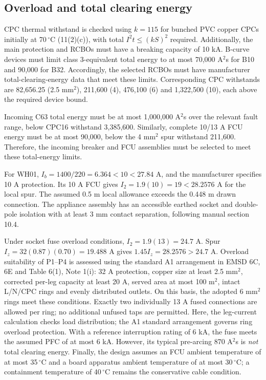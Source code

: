 \subsection*{Overload and total clearing energy}
CPC thermal withstand is checked using $k=115$ for bunched PVC copper CPCs initially at 70\,$^\circ$C (11(2)(c)), with total $I^2t\le(kS)^2$ required. Additionally, the main protection and RCBOs must have a breaking capacity of 10 kA. B-curve devices must limit class 3-equivalent total energy to at most 70,000 A$^2$s for B10 and 90,000 for B32. Accordingly, the selected RCBOs must have manufacturer total-clearing-energy data that meet these limits. Corresponding CPC withstands are 82,656.25 (2.5 mm$^2$), 211,600 (4), 476,100 (6) and 1,322,500 (10), each above the required device bound.

Incoming C63 total energy must be at most 1,000,000 A$^2$s over the relevant fault range, below CPC16 withstand 3,385,600. Similarly, complete 10/13 A FCU energy must be at most 90,000, below the 4 mm$^2$ spur withstand 211,600. Therefore, the incoming breaker and FCU assemblies must be selected to meet these total-energy limits.

For WH01, $I_b=1400/220=6.364<10<27.84$ A, and the manufacturer specifies 10 A protection. Its 10 A FCU gives $I_2=1.9(10)=19<28.2576$ A for the local spur. The assumed 0.5 m local allowance exceeds the 0.448 m drawn connection. The appliance assembly has an accessible earthed socket and double-pole isolation with at least 3 mm contact separation, following manual section 10.4.

Under socket fuse overload conditions, $I_2=1.9(13)=24.7$ A. Spur $I_z=32(0.87)(0.70)=19.488$ A gives $1.45I_z=28.2576>24.7$ A. Overload suitability of P1--P4 is assessed using the standard A1 arrangement in EMSD 6C, 6E and Table 6(1), Note 1(i): 32 A protection, copper size at least 2.5 mm$^2$, corrected per-leg capacity at least 20 A, served area at most 100 m$^2$, intact L/N/CPC rings and evenly distributed outlets. On this basis, the adopted 6 mm$^2$ rings meet these conditions. Exactly two individually 13 A fused connections are allowed per ring; no additional unfused taps are permitted. Here, the leg-current calculation checks load distribution; the A1 standard arrangement governs ring overload protection. With a reference interruption rating of 6 kA, the fuse meets the assumed PFC of at most 6 kA. However, its typical pre-arcing 870 A$^2$s is \emph{not} total clearing energy. Finally, the design assumes an FCU ambient temperature of at most 35\,$^\circ$C and a board apparatus ambient temperature of at most 30\,$^\circ$C; a containment temperature of 40\,$^\circ$C remains the conservative cable condition.
